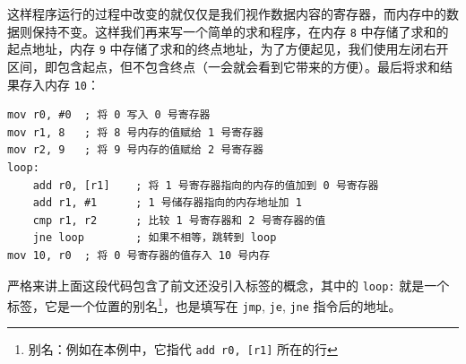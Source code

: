 这样程序运行的过程中改变的就仅仅是我们视作数据内容的寄存器，而内存中的数据则保持不变。这样我们再来写一个简单的求和程序，在内存 \texttt{8} 中存储了求和的起点地址，内存 \texttt{9} 中存储了求和的终点地址，为了方便起见，我们使用左闭右开区间，即包含起点，但不包含终点（一会就会看到它带来的方便）。最后将求和结果存入内存 \texttt{10}：
\begin{verbatim}
mov r0, #0  ; 将 0 写入 0 号寄存器
mov r1, 8   ; 将 8 号内存的值赋给 1 号寄存器
mov r2, 9   ; 将 9 号内存的值赋给 2 号寄存器
loop:
    add r0, [r1]    ; 将 1 号寄存器指向的内存的值加到 0 号寄存器
    add r1, #1      ; 1 号储存器指向的内存地址加 1
    cmp r1, r2      ; 比较 1 号寄存器和 2 号寄存器的值
    jne loop        ; 如果不相等，跳转到 loop
mov 10, r0  ; 将 0 号寄存器的值存入 10 号内存
\end{verbatim}

严格来讲上面这段代码包含了前文还没引入标签的概念，其中的 \texttt{loop:} 就是一个标签，它是一个位置的别名\footnote{别名：例如在本例中，它指代 \texttt{add r0, [r1]} 所在的行}，也是填写在 \texttt{jmp}, \texttt{je}, \texttt{jne} 指令后的地址。

